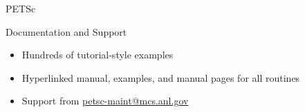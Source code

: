 \begin{frame}{PETSc}
  
  \begin{block}{Documentation and Support}
   \begin{itemize}\vspace*{-0.2cm}
    \item Hundreds of tutorial-style examples
    \item Hyperlinked manual, examples, and manual pages for all routines
    \item Support from \url{petsc-maint@mcs.anl.gov}
   \end{itemize}
  \end{block}

\end{frame}
